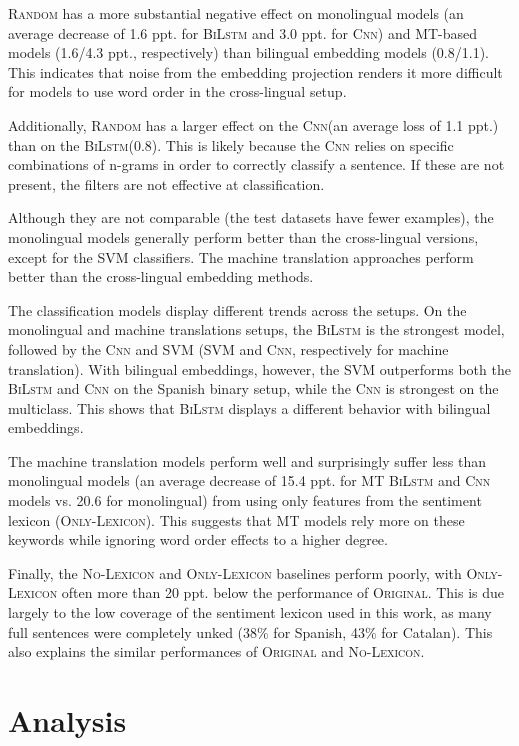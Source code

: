 \documentclass[a4paper,11pt,twocolumn,twoside]{article}
\newcommand{\original}{\textsc{Original}\xspace}
\newcommand{\random}{\textsc{Random}\xspace}
\newcommand{\onlylex}{\textsc{Only-Lexicon}\xspace}
\newcommand{\nolex}{\textsc{No-Lexicon}\xspace}
\newcommand{\bilstm}{\textsc{BiLstm}\xspace}
\newcommand{\cnn}{\textsc{Cnn}\xspace}
\begin{document}
\random has a more substantial negative effect on monolingual models (an average decrease of 1.6 ppt. for \bilstm and 3.0 ppt. for \cnn) and MT-based models (1.6/4.3 ppt., respectively) than bilingual embedding models (0.8/1.1). This indicates that noise from the embedding projection renders it more difficult for models to use word order in the cross-lingual setup.

Additionally, \random has a larger effect on the \cnn (an average loss of 1.1 ppt.) than on the \bilstm (0.8). This is likely because the \cnn relies on specific combinations of n-grams in order to correctly classify a sentence. If these are not present, the filters are not effective at classification.

Although they are not comparable (the test datasets have fewer examples), the monolingual models generally perform better than the cross-lingual versions, except for the SVM classifiers. The machine translation approaches perform better than the cross-lingual embedding methods.

The classification models display different trends across the setups. On the monolingual and machine translations setups, the \bilstm is the strongest model, followed by the \cnn and SVM (SVM and \cnn, respectively for machine translation). With bilingual embeddings, however, the SVM outperforms both the \bilstm and \cnn on the Spanish binary setup, while the \cnn is strongest on the multiclass.  This shows that \bilstm displays a different behavior with bilingual embeddings.

The machine translation models perform well and surprisingly suffer less than monolingual models (an average decrease of 15.4 ppt. for MT \bilstm and \cnn models vs. 20.6 for monolingual)  from using only features from the sentiment lexicon (\onlylex). This suggests that MT models rely more on these keywords while ignoring word order effects to a higher degree.

Finally, the \nolex and \onlylex baselines perform poorly, with \onlylex often more than 20 ppt. below the performance of \original. This is due largely to the low coverage of the sentiment lexicon used in this work, as many full sentences were completely unked (38\% for Spanish, 43\% for Catalan). This also explains the similar performances of \original and \nolex.


\section{Analysis}
\end{document}
